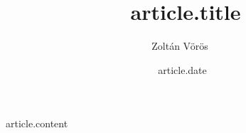 \documentclass[a4paper,10pt]{article}
\author{Zoltán Vörös}
\title{~article.title}
\date{~article.date}
\begin{document}
\maketitle
~article.content
\end{document}
